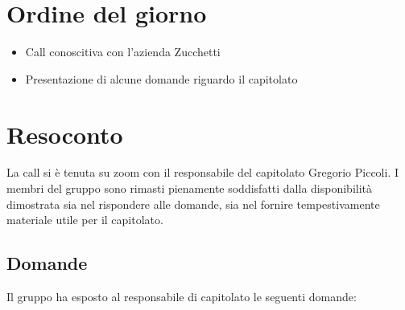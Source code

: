\section{Ordine del giorno}

\begin{itemize}
	\item Call conoscitiva con l'azienda Zucchetti
	\item Presentazione di alcune domande riguardo il capitolato
\end{itemize}

\section{Resoconto}

La call si è tenuta su zoom con il responsabile del capitolato Gregorio Piccoli. 
I membri del gruppo sono rimasti pienamente soddisfatti dalla disponibilità dimostrata sia nel rispondere alle domande, sia nel fornire tempestivamente materiale utile per il capitolato.

\subsection{Domande}

Il gruppo ha esposto al responsabile di capitolato le seguenti domande:

